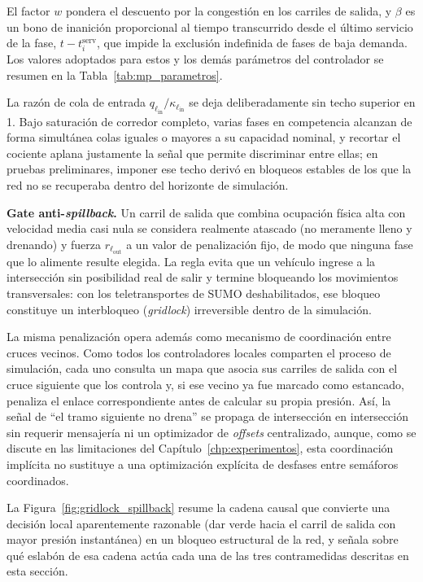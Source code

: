 El factor $w$ pondera el descuento por la congestión en los carriles de salida, y $\beta$ es un bono de inanición proporcional al tiempo transcurrido desde el último servicio de la fase, $t - t_i^{\text{serv}}$, que impide la exclusión indefinida de fases de baja demanda. Los valores adoptados para estos y los demás parámetros del controlador se resumen en la Tabla~\ref{tab:mp_parametros}.

La razón de cola de entrada $q_{\ell_\text{in}}/\kappa_{\ell_\text{in}}$ se deja deliberadamente sin techo superior en 1. Bajo saturación de corredor completo, varias fases en competencia alcanzan de forma simultánea colas iguales o mayores a su capacidad nominal, y recortar el cociente aplana justamente la señal que permite discriminar entre ellas; en pruebas preliminares, imponer ese techo derivó en bloqueos estables de los que la red no se recuperaba dentro del horizonte de simulación.

\textbf{Gate anti-\emph{spillback}.} Un carril de salida que combina ocupación física alta con velocidad media casi nula se considera realmente atascado (no meramente lleno y drenando) y fuerza $r_{\ell_\text{out}}$ a un valor de penalización fijo, de modo que ninguna fase que lo alimente resulte elegida. La regla evita que un vehículo ingrese a la intersección sin posibilidad real de salir y termine bloqueando los movimientos transversales: con los teletransportes de SUMO deshabilitados, ese bloqueo constituye un interbloqueo (\emph{gridlock}) irreversible dentro de la simulación.

La misma penalización opera además como mecanismo de coordinación entre cruces vecinos. Como todos los controladores locales comparten el proceso de simulación, cada uno consulta un mapa que asocia sus carriles de salida con el cruce siguiente que los controla y, si ese vecino ya fue marcado como estancado, penaliza el enlace correspondiente antes de calcular su propia presión. Así, la señal de ``el tramo siguiente no drena'' se propaga de intersección en intersección sin requerir mensajería ni un optimizador de \emph{offsets} centralizado, aunque, como se discute en las limitaciones del Capítulo~\ref{chp:experimentos}, esta coordinación implícita no sustituye a una optimización explícita de desfases entre semáforos coordinados.

La Figura~\ref{fig:gridlock_spillback} resume la cadena causal que convierte una decisión local aparentemente razonable (dar verde hacia el carril de salida con mayor presión instantánea) en un bloqueo estructural de la red, y señala sobre qué eslabón de esa cadena actúa cada una de las tres contramedidas descritas en esta sección.

